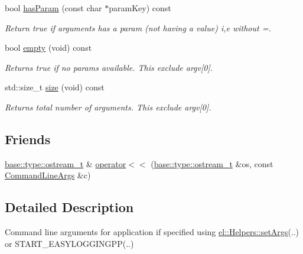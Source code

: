 \begin{DoxyCompactItemize}
bool \hyperlink{classel_1_1base_1_1utils_1_1_command_line_args_a83fbd7e5d8422e98a7d58d65283f144f}{has\+Param} (const char $\ast$param\+Key) const 
\begin{DoxyCompactList}\small\item\em Return true if arguments has a param (not having a value) i,e without \textquotesingle{}=\textquotesingle{}. \end{DoxyCompactList}\item 
bool \hyperlink{classel_1_1base_1_1utils_1_1_command_line_args_a014c586d14eb73f2ec1deb5b08bdd6a7}{empty} (void) const 
\begin{DoxyCompactList}\small\item\em Returns true if no params available. This exclude argv\mbox{[}0\mbox{]}. \end{DoxyCompactList}\item 
std\+::size\+\_\+t \hyperlink{classel_1_1base_1_1utils_1_1_command_line_args_ab335b66a2ca2dea6c9c7b8d54760e975}{size} (void) const 
\begin{DoxyCompactList}\small\item\em Returns total number of arguments. This exclude argv\mbox{[}0\mbox{]}. \end{DoxyCompactList}\end{DoxyCompactItemize}
\subsection*{Friends}
\begin{DoxyCompactItemize}
\item 
\hyperlink{namespaceel_1_1base_1_1type_a74ea109bf34d1c44926837fb0830f445}{base\+::type\+::ostream\+\_\+t} \& \hyperlink{classel_1_1base_1_1utils_1_1_command_line_args_aee5ba4c037136cd1d54026dd75927b10}{operator$<$$<$} (\hyperlink{namespaceel_1_1base_1_1type_a74ea109bf34d1c44926837fb0830f445}{base\+::type\+::ostream\+\_\+t} \&os, const \hyperlink{classel_1_1base_1_1utils_1_1_command_line_args}{Command\+Line\+Args} \&c)
\end{DoxyCompactItemize}


\subsection{Detailed Description}
Command line arguments for application if specified using \hyperlink{classel_1_1_helpers_a68748f618a0c2840b96dc12532b09bf0}{el\+::\+Helpers\+::set\+Args}(..) or S\+T\+A\+R\+T\+\_\+\+E\+A\+S\+Y\+L\+O\+G\+G\+I\+N\+G\+P\+P(..) 

